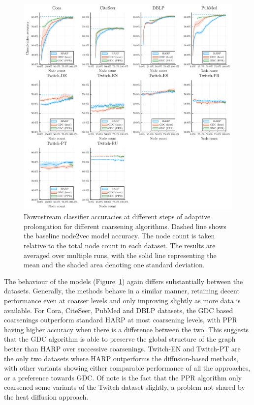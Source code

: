 \begin{figure}
  \centering
  \includegraphics[width=\linewidth]{images/coarsening-algorithms/coarsening-algorithms.pdf}
  \caption{Downstream classifier accuracies at different steps of adaptive prolongation for different coarsening algorithms. Dashed line shows the baseline node2vec model accuracy. The node count is taken relative to the total node count in each dataset. The results are averaged over multiple runs, with the solid line representing the mean and the shaded area denoting one standard deviation.}
  \label{fig:coarsening-algorithms}
\end{figure}

The behaviour of the models (Figure~\ref{fig:coarsening-algorithms}) again differs substantially between the datasets. Generally, the methods behave in a similar manner, retaining decent performance even at coarser levels and only improving slightly as more data is available. For Cora, CiteSeer, PubMed and DBLP datasets, the GDC based coarsenings outperform standard HARP at most coarsening levels, with PPR having higher accuracy when there is a difference between the two. This suggests that the GDC algorithm is able to preserve the global structure of the graph better than HARP over successive coarsenings. Twitch-EN and Twitch-PT are the only two datasets where HARP outperforms the diffusion-based methods, with other variants showing either comparable performance of all the approaches, or a preference towards GDC. Of note is the fact that the PPR algorithm only coarsened some variants of the Twitch dataset slightly, a problem not shared by the heat diffusion approach.

